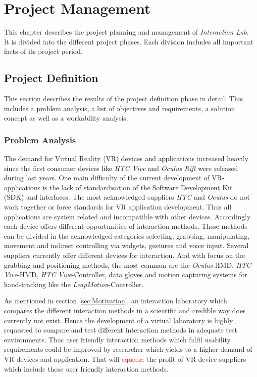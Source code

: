 \section{Project Management} \label{sec:pm}

This chapter describes the project planning and management of \textit{Interaction Lab}. It is divided into the different project phases. Each division includes all important facts of its project period.

\subsection{Project Definition} \label{sec:PMProjectdefinition}

This section describes the results of the project definition phase in detail. This includes a problem analysis, a list of objectives and requirements, a solution concept as well as a workability analysis.

\subsubsection{Problem Analysis}\label{sec:PMProblemAnalysis}
The demand for Virtual Reality (VR) devices and applications increased heavily since the first consumer devices like \textit{HTC Vive} and \textit{Oculus Rift} were released during last years. One main difficulty of the current development of VR-applications is the lack of standardisation of the Software Development Kit (SDK) and interfaces. The most acknowledged suppliers \textit{HTC} and \textit{Oculus} do not work together or force standards for VR application development. Thus all applications are system related and incompatible with other devices. Accordingly each device offers different opportunities of interaction methods. These methods can be divided in the acknowledged categories selecting, grabbing, manipulating, movement and indirect controlling via widgets, gestures and voice input. Several suppliers currently offer different devices for interaction. And with focus on the grabbing and positioning methods, the most common are the \textit{Oculus}-HMD, \textit{HTC Vive}-HMD, \textit{HTC Vive}-Controller, data gloves and motion capturing systems for hand-tracking like the \textit{LeapMotion}-Controller.

As mentioned in section \ref{sec:Motivation}, an interaction laboratory which compares the different interaction methods in a scientific and credible way does currently not exist. Hence the development of a virtual laboratory is highly requested to compare and test different interaction methods in adequate test environments. Thus user friendly interaction methods which fulfil usability requirements could be improved by researcher which yields to a higher demand of VR devices and application. That will \textcolor{red}{squeeze} the profit of VR device suppliers which include those user friendly interaction methods. 

